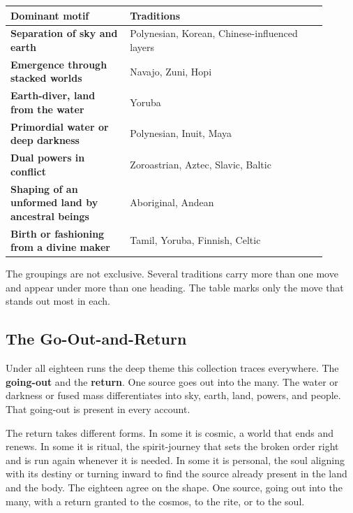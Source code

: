 \begin{longtable}{L{0.34\linewidth}
L{0.56\linewidth}}
\toprule
\textbf{Dominant motif} & \textbf{Traditions} \\
\midrule
\textbf{Separation of sky and earth} & Polynesian, Korean, Chinese-influenced layers \\
\textbf{Emergence through stacked worlds} & Navajo, Zuni, Hopi \\
\textbf{Earth-diver, land from the water} & Yoruba \\
\textbf{Primordial water or deep darkness} & Polynesian, Inuit, Maya \\
\textbf{Dual powers in conflict} & Zoroastrian, Aztec, Slavic, Baltic \\
\textbf{Shaping of an unformed land by ancestral beings} & Aboriginal, Andean \\
\textbf{Birth or fashioning from a divine maker} & Tamil, Yoruba, Finnish, Celtic \\
\bottomrule
\end{longtable}

The groupings are not exclusive. Several traditions carry more than one move and appear under more than one heading. The table marks only the move that stands out most in each.

\subsection{The Go-Out-and-Return}

Under all eighteen runs the deep theme this collection traces everywhere. The \textbf{going-out} and the \textbf{return}. One source goes out into the many. The water or darkness or fused mass differentiates into sky, earth, land, powers, and people. That going-out is present in every account.

The return takes different forms. In some it is cosmic, a world that ends and renews. In some it is ritual, the spirit-journey that sets the broken order right and is run again whenever it is needed. In some it is personal, the soul aligning with its destiny or turning inward to find the source already present in the land and the body. The eighteen agree on the shape. One source, going out into the many, with a return granted to the cosmos, to the rite, or to the soul.
